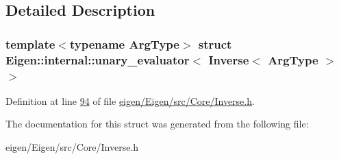 \subsection{Detailed Description}
\subsubsection*{template$<$typename Arg\+Type$>$\newline
struct Eigen\+::internal\+::unary\+\_\+evaluator$<$ Inverse$<$ Arg\+Type $>$ $>$}



Definition at line \hyperlink{eigen_2_eigen_2src_2_core_2_inverse_8h_source_l00094}{94} of file \hyperlink{eigen_2_eigen_2src_2_core_2_inverse_8h_source}{eigen/\+Eigen/src/\+Core/\+Inverse.\+h}.



The documentation for this struct was generated from the following file\+:\begin{DoxyCompactItemize}
\item 
eigen/\+Eigen/src/\+Core/\+Inverse.\+h\end{DoxyCompactItemize}
